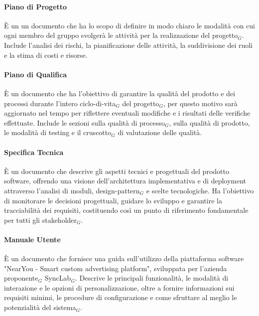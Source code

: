 \documentclass[10pt]{article}
\begin{document}
\begin{justify}
        \paragraph{Piano di Progetto}
        È un un documento che ha lo scopo di definire in modo chiaro le modalità con cui ogni membro del gruppo svolgerà le attività per la realizzazione del progetto$_G$. Include l'analisi dei rischi, la pianificazione delle attività, la suddivisione dei ruoli e la stima di costi e risorse.\\

        \paragraph{Piano di Qualifica}
        È un documento che ha l'obiettivo di garantire la qualità del prodotto e dei processi durante l'intero ciclo-di-vita$_G$ del progetto$_G$, per questo motivo sarà aggiornato nel tempo per riflettere eventuali modifiche e i risultati delle verifiche effettuate. Include le sezioni sulla qualità di processo$_G$, sulla qualità di prodotto, le modalità di testing e il cruscotto$_G$ di valutazione delle qualità.\\

        \paragraph{Specifica Tecnica}
        È un documento che descrive gli aspetti tecnici e progettuali del prodotto software, offrendo una visione dell'architettura implementativa e di deployment attraverso l'analisi di moduli, design-pattern$_G$ e scelte tecnologiche. Ha l'obiettivo di monitorare le decisioni progettuali, guidare lo sviluppo e garantire la tracciabilità dei requisiti, costituendo così un punto di riferimento fondamentale per tutti gli stakeholder$_G$.\\

        \paragraph{Manuale Utente}
        È un documento che fornisce una guida sull'utilizzo della piattaforma software "NearYou - Smart custom advertising platform", sviluppata per l'azienda proponente$_G$ SyncLab$_G$. Descrive le principali funzionalità, le modalità di interazione e le opzioni di personalizzazione, oltre a fornire informazioni sui requisiti minimi, le procedure di configurazione e come sfruttare al meglio le potenzialità del sistema$_G$.\\


\end{justify}
\end{document}
